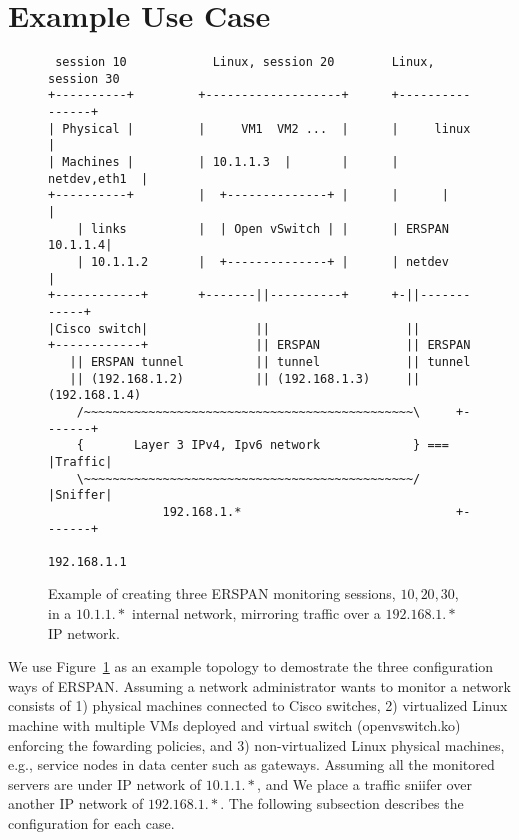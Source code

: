 \documentclass{sigplanconf}
\begin{document}
\section{Example Use Case}
\begin{figure}
{\scriptsize
\begin{verbatim}
 session 10            Linux, session 20        Linux, session 30
+----------+         +-------------------+      +----------------+
| Physical |         |     VM1  VM2 ...  |      |     linux      |
| Machines |         | 10.1.1.3  |       |      |   netdev,eth1  |
+----------+         |  +--------------+ |      |      |         |
    | links          |  | Open vSwitch | |      | ERSPAN 10.1.1.4|
    | 10.1.1.2       |  +--------------+ |      | netdev         |
+------------+       +-------||----------+      +-||------------+ 
|Cisco switch|               ||                   ||
+------------+               || ERSPAN            || ERSPAN
   || ERSPAN tunnel          || tunnel            || tunnel
   || (192.168.1.2)          || (192.168.1.3)     || (192.168.1.4)
    /~~~~~~~~~~~~~~~~~~~~~~~~~~~~~~~~~~~~~~~~~~~~~~\     +-------+ 
    {       Layer 3 IPv4, Ipv6 network             } === |Traffic|
    \~~~~~~~~~~~~~~~~~~~~~~~~~~~~~~~~~~~~~~~~~~~~~~/     |Sniffer|
                192.168.1.*                              +-------+
                                                        192.168.1.1
\end{verbatim}   
}
\vspace{-0.5em}
\caption{Example of creating three ERSPAN monitoring sessions, $10, 20, 30$,
in a $10.1.1.*$ internal network, mirroring traffic over a $192.168.1.*$ IP network.}
\label{example}
\vspace{-1.0em}
\end{figure}

We use Figure~\ref{example} as an example topology to demostrate
the three configuration ways of ERSPAN.
Assuming a network administrator wants to monitor a network consists
of 1) physical machines connected to Cisco switches, 2)
virtualized Linux machine with multiple VMs deployed and virtual switch
(openvswitch.ko) enforcing the fowarding policies, and
3) non-virtualized Linux physical machines, e.g., service nodes
in data center such as gateways.
Assuming all the monitored servers are under IP network of $10.1.1.*$,
and We place a traffic sniifer over another IP network of $192.168.1.*$.
The following subsection describes the configuration for each case.
\end{document}

